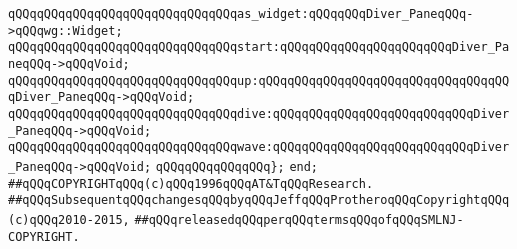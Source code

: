 \newline
\verb|qQQqqQQqqQQqqQQqqQQqqQQqqQQqqQQqas_widget:qQQqqQQqDiver_PaneqQQq->qQQqwg::Widget;|\newline
\verb|qQQqqQQqqQQqqQQqqQQqqQQqqQQqqQQqstart:qQQqqQQqqQQqqQQqqQQqqQQqDiver_PaneqQQq->qQQqVoid;|\newline
\verb|qQQqqQQqqQQqqQQqqQQqqQQqqQQqqQQqup:qQQqqQQqqQQqqQQqqQQqqQQqqQQqqQQqqQQqDiver_PaneqQQq->qQQqVoid;|\newline
\verb|qQQqqQQqqQQqqQQqqQQqqQQqqQQqqQQqdive:qQQqqQQqqQQqqQQqqQQqqQQqqQQqDiver_PaneqQQq->qQQqVoid;|\newline
\verb|qQQqqQQqqQQqqQQqqQQqqQQqqQQqqQQqwave:qQQqqQQqqQQqqQQqqQQqqQQqqQQqDiver_PaneqQQq->qQQqVoid;|\newline
\verb|qQQqqQQqqQQqqQQq};|\newline
\newline
\verb|end;|\newline
\newline
\verb|##qQQqCOPYRIGHTqQQq(c)qQQq1996qQQqAT&TqQQqResearch.|\newline
\verb|##qQQqSubsequentqQQqchangesqQQqbyqQQqJeffqQQqProtheroqQQqCopyrightqQQq(c)qQQq2010-2015,|\newline
\verb|##qQQqreleasedqQQqperqQQqtermsqQQqofqQQqSMLNJ-COPYRIGHT.|\newline

